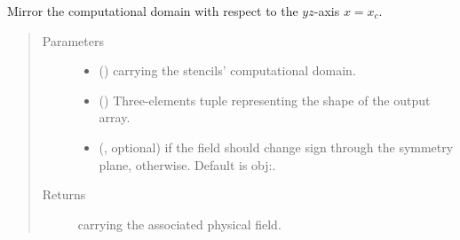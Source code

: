\documentclass[letterpaper,10pt,english]{sphinxmanual}
\begin{document}
\begin{fulllineitems}
\begin{fulllineitems}
\begin{quote}
\begin{description}
\begin{itemize}
\end{itemize}

\end{description}\end{quote}

\end{fulllineitems}


\begin{fulllineitems}
\label{\detokenize{api:dycore.horizontal_boundary.RelaxedSymmetricYZ.from_computational_to_physical_domain}}
Mirror the computational domain with respect to the \(yz\)-axis \(x = x_c\).
\begin{quote}\begin{description}
\item[{Parameters}] \leavevmode\begin{itemize}
\item {} 
 () \textendash{}  carrying the stencils’ computational domain.

\item {} 
 () \textendash{} Three-elements tuple representing the shape of the output array.

\item {} 
 (, optional) \textendash{}  if the field should change sign through the
symmetry plane,  otherwise. Default is obj:.

\end{itemize}

\item[{Returns}] \leavevmode
{} carrying the associated physical field.

\end{description}\end{quote}

\end{fulllineitems}


\end{fulllineitems}
\end{document}
